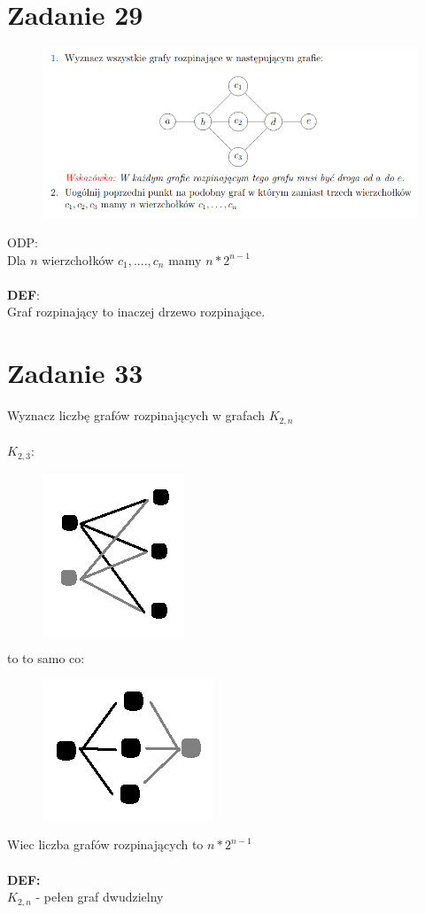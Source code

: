 \documentclass{article}
\begin{document}
\section{\centering Zadanie 29}
\begin{figure}[H]
	\centering
	\includegraphics[width=0.9\linewidth]{z29.png}  
\end{figure}
\noindent ODP: \\
Dla $n$ wierzchołków $c_{1},....,c_{n}$ mamy $n * 2^{n-1}$\\\\
\noindent \textbf{DEF}:\\
Graf rozpinający to inaczej drzewo rozpinające. 
\section{\centering Zadanie 33}
Wyznacz liczbę grafów rozpinających w grafach $K_{2,n}$ \\\\

$K_{2,3}$: \\
\begin{figure}[H]
	\centering
	\includegraphics[width=0.1\linewidth]{z33_1.png}  
\end{figure}
to to samo co: \\
\begin{figure}[H]
	\centering
	\includegraphics[width=0.1\linewidth]{z33_2.png}  
\end{figure}
Wiec liczba grafów rozpinających to $n * 2^{n-1}$\\\\
\noindent \textbf{DEF:} \\
$K_{2,n}$ - pełen graf dwudzielny \\
\end{document}

